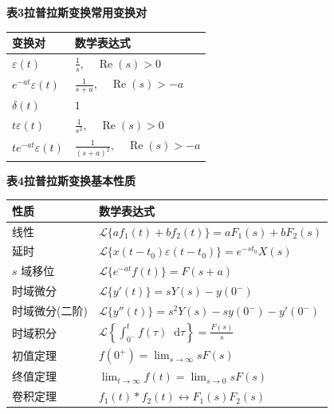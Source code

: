 \documentclass[12pt,a4paper]{ctexart}
\newcommand{\eps}{\varepsilon}
\newcommand{\dif}{\mathop{}\!\mathrm{d}}
\begin{document}
\par\bigskip
\noindent\textbf{表3\quad 拉普拉斯变换常用变换对}
\vspace{0.4em}

\begin{tabular}{p{}p{}}
\toprule
\textbf{变换对} & \textbf{数学表达式}\\
\midrule
$\displaystyle\eps(t)$ & $\displaystyle\frac1s,\quad\operatorname{Re}(s)>0$\\[0.35em]
$\displaystyle e^{-at}\eps(t)$ & $\displaystyle\frac1{s+a},\quad\operatorname{Re}(s)>-a$\\[0.35em]
$\displaystyle\delta(t)$ & $1$\\[0.35em]
$\displaystyle t\eps(t)$ & $\displaystyle\frac1{s^2},\quad\operatorname{Re}(s)>0$\\[0.35em]
$\displaystyle te^{-at}\eps(t)$ & $\displaystyle\frac1{(s+a)^2},\quad\operatorname{Re}(s)>-a$\\
\bottomrule
\end{tabular}

\par\bigskip
\noindent\textbf{表4\quad 拉普拉斯变换基本性质}
\vspace{0.4em}

\begin{tabular}{p{}p{}}
\toprule
\textbf{性质} & \textbf{数学表达式}\\
\midrule
线性 & $\displaystyle\mathcal L\{af_1(t)+bf_2(t)\}=aF_1(s)+bF_2(s)$\\[0.35em]
延时 & $\displaystyle\mathcal L\{x(t-t_0)\eps(t-t_0)\}=e^{-st_0}X(s)$\\[0.35em]
$s$ 域移位 & $\displaystyle\mathcal L\{e^{-at}f(t)\}=F(s+a)$\\[0.35em]
时域微分 & $\displaystyle\mathcal L\{y'(t)\}=sY(s)-y(0^-)$\\[0.35em]
时域微分(二阶) & $\displaystyle\mathcal L\{y''(t)\}=s^2Y(s)-sy(0^-)-y'(0^-)$\\[0.35em]
时域积分 & $\displaystyle\mathcal L\!\left\{\int_{0^-}^{t}f(\tau)\dif\tau\right\}=\frac{F(s)}{s}$\\[0.35em]
初值定理 & $\displaystyle f(0^+)=\lim_{s\to\infty}sF(s)$\\[0.35em]
终值定理 & $\displaystyle\lim_{t\to\infty}f(t)=\lim_{s\to0}sF(s)$\\[0.35em]
卷积定理 & $\displaystyle f_1(t)*f_2(t)\longleftrightarrow F_1(s)F_2(s)$\\
\bottomrule
\end{tabular}
\end{document}
